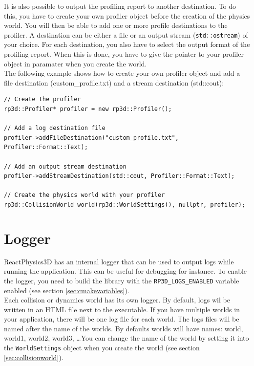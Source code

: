 \documentclass[a4paper,12pt]{article}
\begin{document}
    It is also possible to output the profiling report to another destination. To do this,
    you have to create your own profiler object before the creation of the physics world. You will then be able to add one or more profile destinations
    to the profiler. A destination can be either a file or an output stream (\texttt{std::ostream}) of your choice. For each destination, you also
    have to select the output format of the profiling report. When this is done, you have to give the pointer to your profiler object in paramater
    when you create the world. \\

    The following example shows how to create your own profiler object and add a file destination (custom\_profile.txt) and a stream destination (std::cout): \\

    \begin{lstlisting}
// Create the profiler
rp3d::Profiler* profiler = new rp3d::Profiler();

// Add a log destination file
profiler->addFileDestination("custom_profile.txt", Profiler::Format::Text);

// Add an output stream destination 
profiler->addStreamDestination(std::cout, Profiler::Format::Text);

// Create the physics world with your profiler
rp3d::CollisionWorld world(rp3d::WorldSettings(), nullptr, profiler);
    \end{lstlisting}

    \section{Logger}
    \label{sec:logger}

    ReactPhysics3D has an internal logger that can be used to output logs while running the application. This can be useful for debugging for instance.
    To enable the logger, you need to build the library with the \texttt{RP3D\_LOGS\_ENABLED} variable enabled (see section \ref{sec:cmakevariables}). \\

    Each collision or dynamics world has its own logger. By default, logs wil be written in an HTML file next to the executable.
    If you have multiple worlds in your application, there will be one log file for each world. The logs files will be named after the
    name of the worlds. By defaults worlds will have names: world, world1, world2, world3, \dots You can change the name of the world by
    setting it into the \texttt{WorldSettings} object when you create the world (see section \ref{sec:collisionworld}). \\
\end{document}
